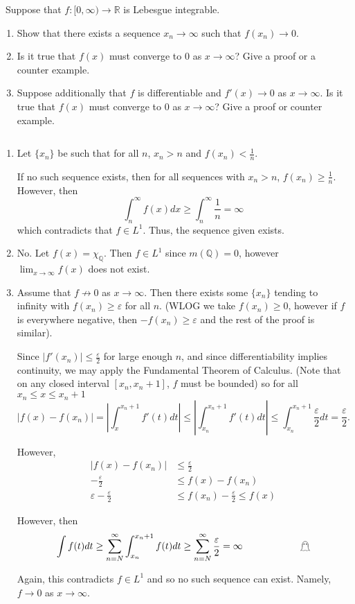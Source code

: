 \documentclass[12pt]{Homework}
\newcommand{\contradiction}{\null\hfill\large{$\mathghost$}\normalsize}
\begin{document}
\begin{problem} $\,$
Suppose that $f:[0,\infty)\to\mathbb{R}$ is Lebesgue integrable.
\begin{enumerate}[label=(\alph*)]
    \item Show that there exists a sequence $x_n\to\infty$ such that $f(x_n)\to0$.
    \item Is it true that $f(x)$ must converge to $0$ as $x\to\infty$? Give a proof or a counter example. 
    \item Suppose additionally that $f$ is differentiable and $f'(x)\to0$ as $x\to\infty$. Is it true that $f(x)$ must converge to $0$ as $x\to\infty$? Give a proof or counter example.
\end{enumerate}
\end{problem}


\begin{solution}$\,$
\begin{enumerate}[label=(\alph*)]
    \item Let $\{x_n\}$ be such that for all $n$, $x_n>n$ and $f(x_n)<\frac{1}{n}$.
    
    If no such sequence exists, then for all sequences with $x_n>n$, $f(x_n)\ge\frac{1}{n}$. However, then $$\int_n^\infty f(x)dx\ge\int_n^\infty\frac{1}{n}=\infty$$ which contradicts that $f\in L^1$. Thus, the sequence given exists. 
    \item No. Let $f(x)=\chi_\mathbb{Q}$. Then $f\in L^1$ since $m(\mathbb{Q})=0$, however $\lim_{x\to\infty} f(x)$ does not exist.
    \item Assume that $f\not\to 0$ as $x\to\infty$. Then there exists some $\{x_n\}$ tending to infinity with $f(x_n)\ge\varepsilon$ for all $n$. (WLOG we take $f(x_n)\ge0$, however if $f$ is everywhere negative, then $-f(x_n)\ge\varepsilon$ and the rest of the proof is similar).
    
    Since $|f'(x_n)|\le \frac{\varepsilon}{2}$ for large enough $n$, and since differentiability implies continuity, we may apply the Fundamental Theorem of Calculus. (Note that on any closed interval $[x_n,x_n+1]$, $f$ must be bounded) so for all $x_n\le x\le x_n+1$ $$|f(x)-f(x_n)|=\left|\int_{x}^{x_n+1}f'(t)dt\right|\le\left|\int_{x_n}^{x_n+1}f'(t)dt\right|\le\int_{x_n}^{x_n+1}\frac{\varepsilon}{2} dt=\frac{\varepsilon}{2}.$$
    
    However, \begin{align*}
        |f(x)-f(x_n)|&\le\frac{\varepsilon}{2}\\
        -\frac{\varepsilon}{2}&\le f(x)-f(x_n)\\
      \varepsilon-\frac{\varepsilon}{2}&\le f(x_n)-\frac{\varepsilon}{2}\le f(x)
    \end{align*}
    
    However, then $$\int f(t)dt\ge \sum_{n=N}^\infty\int_{x_n}^{x_n+1}f(t)dt\ge\sum_{n=N}^\infty\frac{\varepsilon}{2}=\infty\qquad\qquad\qquad\text{\contradiction}$$
    
    Again, this contradicts $f\in L^1$ and so no such sequence can exist. Namely, $f\to0$ as $x\to\infty$.
\end{enumerate}
\end{solution}
\newpage
\end{document}
